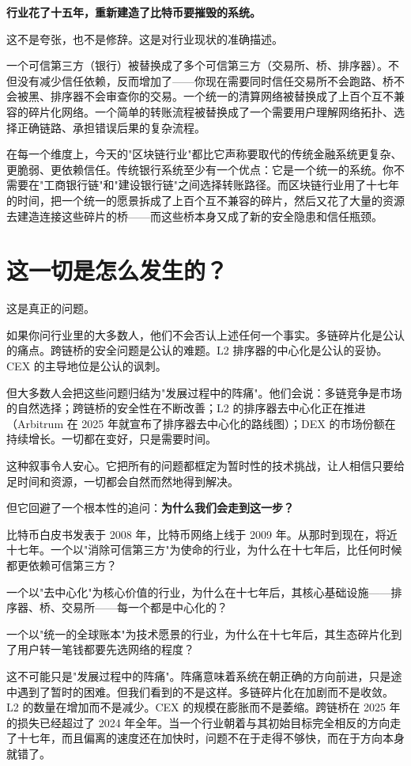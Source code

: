\documentclass[a4paper,12pt,openany]{ctexbook}
\begin{document}
\textbf{行业花了十五年，重新建造了比特币要摧毁的系统。}

这不是夸张，也不是修辞。这是对行业现状的准确描述。

一个可信第三方（银行）被替换成了多个可信第三方（交易所、桥、排序器）。不但没有减少信任依赖，反而增加了——你现在需要同时信任交易所不会跑路、桥不会被黑、排序器不会审查你的交易。一个统一的清算网络被替换成了上百个互不兼容的碎片化网络。一个简单的转账流程被替换成了一个需要用户理解网络拓扑、选择正确链路、承担错误后果的复杂流程。

在每一个维度上，今天的"区块链行业"都比它声称要取代的传统金融系统更复杂、更脆弱、更依赖信任。传统银行系统至少有一个优点：它是一个统一的系统。你不需要在"工商银行链"和"建设银行链"之间选择转账路径。而区块链行业用了十七年的时间，把一个统一的愿景拆成了上百个互不兼容的碎片，然后又花了大量的资源去建造连接这些碎片的桥——而这些桥本身又成了新的安全隐患和信任瓶颈。


\section*{这一切是怎么发生的？}


这是真正的问题。

如果你问行业里的大多数人，他们不会否认上述任何一个事实。多链碎片化是公认的痛点。跨链桥的安全问题是公认的难题。L2 排序器的中心化是公认的妥协。CEX 的主导地位是公认的讽刺。

但大多数人会把这些问题归结为"发展过程中的阵痛"。他们会说：多链竞争是市场的自然选择；跨链桥的安全性在不断改善；L2 的排序器去中心化正在推进（Arbitrum 在 2025 年就宣布了排序器去中心化的路线图）；DEX 的市场份额在持续增长。一切都在变好，只是需要时间。

这种叙事令人安心。它把所有的问题都框定为暂时性的技术挑战，让人相信只要给足时间和资源，一切都会自然而然地得到解决。

但它回避了一个根本性的追问：\textbf{为什么我们会走到这一步？}

比特币白皮书发表于 2008 年，比特币网络上线于 2009 年。从那时到现在，将近十七年。一个以"消除可信第三方"为使命的行业，为什么在十七年后，比任何时候都更依赖可信第三方？

一个以"去中心化"为核心价值的行业，为什么在十七年后，其核心基础设施——排序器、桥、交易所——每一个都是中心化的？

一个以"统一的全球账本"为技术愿景的行业，为什么在十七年后，其生态碎片化到了用户转一笔钱都要先选网络的程度？

这不可能只是"发展过程中的阵痛"。阵痛意味着系统在朝正确的方向前进，只是途中遇到了暂时的困难。但我们看到的不是这样。多链碎片化在加剧而不是收敛。L2 的数量在增加而不是减少。CEX 的规模在膨胀而不是萎缩。跨链桥在 2025 年的损失已经超过了 2024 年全年。当一个行业朝着与其初始目标完全相反的方向走了十七年，而且偏离的速度还在加快时，问题不在于走得不够快，而在于方向本身就错了。
\end{document}
